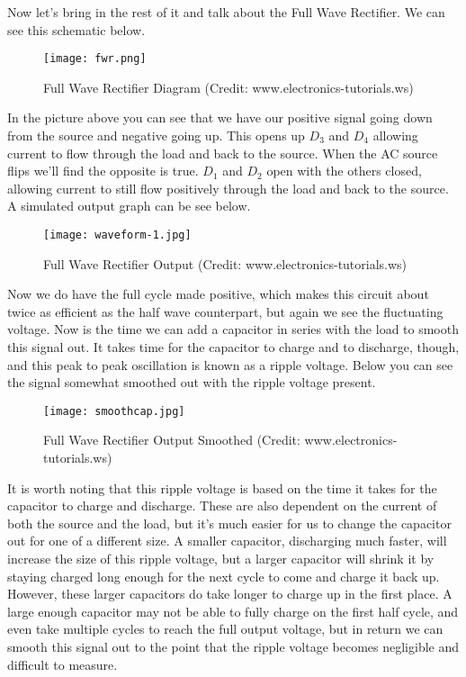 \documentclass[prb,preprint]{revtex4-1}
\begin{document}
Now let's bring in the rest of it and talk about the Full Wave Rectifier. We can see this schematic below.

\begin{figure}[ht]
	\centering
	\texttt{[image: fwr.png]}
	\caption{Full Wave Rectifier Diagram (Credit: www.electronics-tutorials.ws)}
	\label{fig1}
\end{figure}

In the picture above you can see that we have our positive signal going down from the source and negative going up. This opens up $D_{3}$ and $D_{4}$ allowing current to flow through the load and back to the source.
When the AC source flips we'll find the opposite is true. $D_{1}$ and $D_{2}$ open with the others closed, allowing current to still flow positively through the load and back to the source. A simulated output graph can be see below.

\begin{figure}[ht]
	\centering
	\texttt{[image: waveform-1.jpg]}
	\caption{Full Wave Rectifier Output (Credit: www.electronics-tutorials.ws)}
	\label{fig1}
\end{figure}

Now we do have the full cycle made positive, which makes this circuit about twice as efficient as the half wave counterpart, but again we see the fluctuating voltage.
Now is the time we can add a capacitor in series with the load to smooth this signal out. It takes time for the capacitor to charge and to discharge, though, and this peak to peak oscillation is known as a ripple voltage. Below you can see the signal somewhat smoothed out with the ripple voltage present.

\begin{figure}[ht]
	\centering
	\texttt{[image: smoothcap.jpg]}
	\caption{Full Wave Rectifier Output Smoothed (Credit: www.electronics-tutorials.ws)}
	\label{fig1}
\end{figure}

It is worth noting that this ripple voltage is based on the time it takes for the capacitor to charge and discharge. These are also dependent on the current of both the source and the load, but it's much easier for us to change the capacitor out for one of a different size. A smaller capacitor, discharging much faster, will increase the size of this ripple voltage, but a larger capacitor will shrink it by staying charged long enough for the next cycle to come and charge it back up. However, these larger capacitors do take longer to charge up in the first place. A large enough capacitor may not be able to fully charge on the first half cycle, and even take multiple cycles to reach the full output voltage, but in return we can smooth this signal out to the point that the ripple voltage becomes negligible and difficult to measure.
\end{document}
